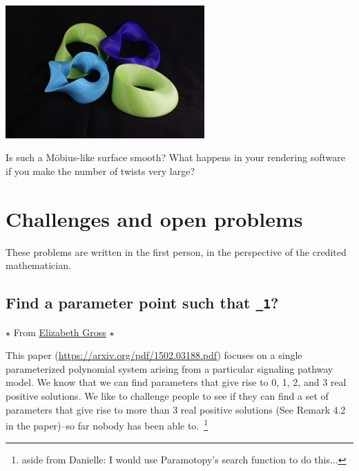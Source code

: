 \documentclass[letter,portrait]{article}
\newcommand{\1}{{\tt \_1}}
\newcommand{\2}{{\tt \_2}}
\begin{document}
\begin{center}
\includegraphics[width=3in]{diagrams/mobius.jpg}
\end{center}

Is such a M\"obius-like surface smooth?  What happens in your rendering software if you make the number of twists very large?




















\clearpage
\section{Challenges and open problems}

These problems are written in the first person, in the perspective of the credited mathematician.



\subsection{Find a parameter point such that \1?}

$\star$ From \href{https://math.hawaii.edu/wordpress/people/egross/}{Elizabeth Gross} $\star$


This paper (\url{https://arxiv.org/pdf/1502.03188.pdf}) focuses on a single parameterized polynomial system arising from a particular signaling pathway model.  We know that we can find parameters that give rise to 0, 1, 2, and 3 real positive solutions.  We like to challenge people to see if they can find a set of parameters that give rise to more than 3 real positive solutions (See Remark 4.2 in the paper)--so far nobody has been able to.~\footnote{aside from Danielle: I would use Paramotopy's search function to do this...}
\end{document}
